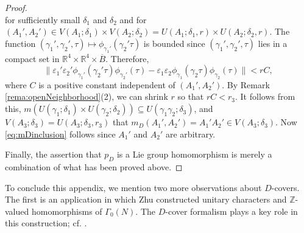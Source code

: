 \documentclass[12pt]{amsart}
\numberwithin{equation}{section}
\theoremstyle{plain}
\theoremstyle{definition}
\theoremstyle{remark}
\newcommand\numZ{\mathbb{Z}}
\newcommand\numR{\mathbb{R}}
\begin{document}
\begin{appendix}
\begin{proof}
\begin{equation*}
\end{equation*}
for sufficiently small $\delta_1$ and $\delta_2$ and for $(A_1',A_2')\in V(A_1;\delta_1)\times V(A_2;\delta_2)=U(A_1;\delta_1,r)\times U(A_2;\delta_2,r)$. The function $(\gamma_1',\gamma_2',\tau)\mapsto\phi_{\gamma_1'}(\gamma_2'\tau)$ is bounded since $(\gamma_1',\gamma_2',\tau)$ lies in a compact set in $\numR^4\times\numR^4\times\overline{B}$. Therefore,
\begin{equation*}
\lVert\varepsilon_1'\varepsilon_2'\phi_{\gamma_1'}(\gamma_2'\tau)\phi_{\gamma_2'}(\tau)-\varepsilon_1\varepsilon_2\phi_{\gamma_1}(\gamma_2\tau)\phi_{\gamma_2}(\tau)\rVert<rC,
\end{equation*}
where $C$ is a positive constant independent of $(A_1',A_2')$. By Remark \ref{rema:openNeighborhood}(2), we can shrink $r$ so that $rC<r_3$. It follows from this, $m(U(\gamma_1;\delta_1)\times U(\gamma_2;\delta_2))\subseteq U(\gamma_1\gamma_2;\delta_3)$, and $V(A_3;\delta_3)=U(A_3;\delta_3,r_3)$ that $m_D(A_1',A_2')=A_1'A_2'\in V(A_3;\delta_3)$. Now \eqref{eq:mDinclusion} follows since $A_1'$ and $A_2'$ are arbitrary.

Finally, the assertion that $p_D$ is a Lie group homomorphism is merely a combination of what has been proved above.
\end{proof}

To conclude this appendix, we mention two more observations about $D$-covers. The first is an application in which Zhu \cite{Zhu25} constructed unitary characters and $\numZ$-valued homomorphisms of $\Gamma_0(N)$. The $D$-cover formalism plays a key role in this construction; cf. \cite[Propositions 2.1 and 3.1]{Zhu25}.


\end{appendix}
\end{document}
